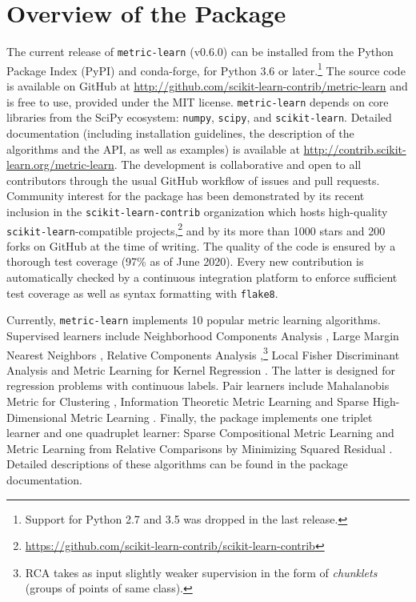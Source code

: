 \documentclass[twoside,11pt]{article}
\newcommand{\aurelien}[1]{\todo[inline,caption={},color=orange!40]{{\it Aurelien:~}#1}}
\begin{document}
\section{Overview of the Package}

The current release of \texttt{metric-learn} (v0.6.0) can be installed from the Python Package Index (PyPI) and conda-forge, for Python 3.6 or later.\footnote{Support for Python 2.7 and 3.5 was dropped in the last release.}
The source code is available on GitHub at \url{http://github.com/scikit-learn-contrib/metric-learn} and is free to use, provided under the MIT license. 
\texttt{metric-learn} depends on core libraries from the SciPy ecosystem: \texttt{numpy}, \texttt{scipy}, and \texttt{scikit-learn}.
Detailed documentation (including installation guidelines, the description of the algorithms and the API, as well as examples) is available at \url{http://contrib.scikit-learn.org/metric-learn}.
The development is collaborative and open to all contributors through the usual GitHub workflow of issues and pull requests.
Community interest for the package has been demonstrated by its recent inclusion in the \texttt{scikit-learn-contrib} organization which hosts high-quality \texttt{scikit-learn}-compatible projects,\footnote{\url{https://github.com/scikit-learn-contrib/scikit-learn-contrib}} and by its more than 1000 stars and 200 forks on GitHub at the time of writing.
The quality of the code is ensured by a thorough test coverage (97\% as of June 2020).
Every new contribution is automatically checked by a continuous integration platform to enforce sufficient test coverage as well as syntax formatting with \texttt{flake8}. %

Currently, \texttt{metric-learn} implements 10 popular metric learning algorithms.
Supervised learners include Neighborhood Components Analysis \citep[NCA,][]{Goldberger04}, Large Margin Nearest Neighbors \citep[LMNN,][]{Weinberger09}, Relative Components Analysis \citep[RCA,][]{Shental02},\footnote{RCA takes as input slightly weaker supervision in the form of \emph{chunklets} (groups of points of same class).} Local Fisher Discriminant Analysis \citep[LFDA,][]{Sugiyama07} and Metric Learning for Kernel Regression \citep[MLKR,][]{Weinberger07}.
The latter is designed for regression problems with continuous labels.
Pair learners include Mahalanobis Metric for Clustering \citep[MMC,][]{Xing2002a}, Information Theoretic Metric Learning \citep[ITML,][]{Davis07} and Sparse High-Dimensional Metric Learning \citep[SDML,][]{Qi09}.
Finally, the package implements one triplet learner and one quadruplet learner: Sparse Compositional Metric Learning \citep[SCML,][]{Shi15} and Metric Learning from Relative Comparisons by Minimizing Squared Residual \citep[LSML,][]{Liu12}.
Detailed descriptions of these algorithms can be found in the package documentation.
\end{document}
